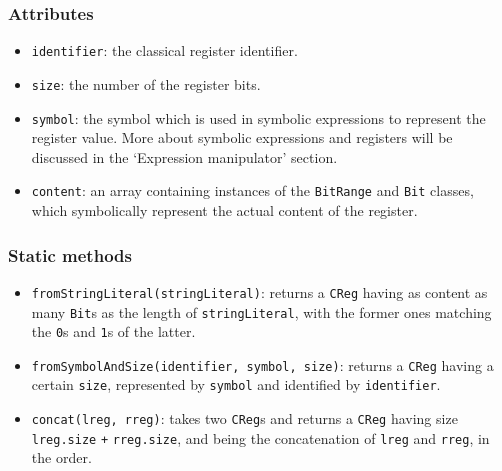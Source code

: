\documentclass[12pt,a4paper]{report}
\theoremstyle{definition}
\theoremstyle{definition}
\theoremstyle{definition}
\begin{document}
\subsubsection{Attributes}
\begin{itemize}
    \itemsep 0em
    \item \texttt{identifier}: the classical register identifier.
    \item \texttt{size}: the number of the register bits.
    \item \texttt{symbol}: the symbol which is used in symbolic expressions to represent the register value. More about symbolic expressions and registers will be discussed in the `Expression manipulator' section.
    \item \texttt{content}: an array containing instances of the \texttt{BitRange} and \texttt{Bit} classes, which symbolically represent the actual content of the register.
\end{itemize}
\subsubsection{Static methods}
\begin{itemize}
    \item \texttt{fromStringLiteral(stringLiteral)}: returns a \texttt{CReg} having as content as many \texttt{Bit}s as the length of \texttt{stringLiteral}, with the former ones matching the \texttt{0}s and \texttt{1}s of the latter.
    \item \texttt{fromSymbolAndSize(identifier, symbol, size)}: returns a \texttt{CReg} having a certain \texttt{size}, represented by \texttt{symbol} and identified by \texttt{identifier}.
    \item \texttt{concat(lreg, rreg)}: takes two \texttt{CReg}s and returns a \texttt{CReg} having size \texttt{lreg.size} \texttt{+} \texttt{rreg.size}, and being the concatenation of \texttt{lreg} and \texttt{rreg}, in the order.
\end{itemize}
\end{document}
